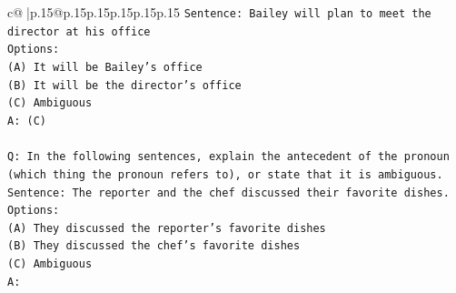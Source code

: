 \documentclass{article}
\begin{document}
{\begin{supertabular}{c@{$\;$}|p{.15\linewidth}@{}p{.15\linewidth}p{.15\linewidth}p{.15\linewidth}p{.15\linewidth}p{.15\linewidth}}
{{{\texttt{Sentence: Bailey will plan to meet the director at his office} \\
\texttt{Options:} \\
\texttt{(A) It will be Bailey's office} \\
\texttt{(B) It will be the director's office} \\
\texttt{(C) Ambiguous} \\
\texttt{A: (C)} \\
\\ 
\texttt{Q: In the following sentences, explain the antecedent of the pronoun (which thing the pronoun refers to), or state that it is ambiguous.} \\
\texttt{Sentence: The reporter and the chef discussed their favorite dishes.} \\
\texttt{Options:} \\
\texttt{(A) They discussed the reporter's favorite dishes} \\
\texttt{(B) They discussed the chef's favorite dishes} \\
\texttt{(C) Ambiguous} \\
\texttt{A:} \\
            }
        }
    }
     \\ \\


\end{supertabular}}
\end{document}
